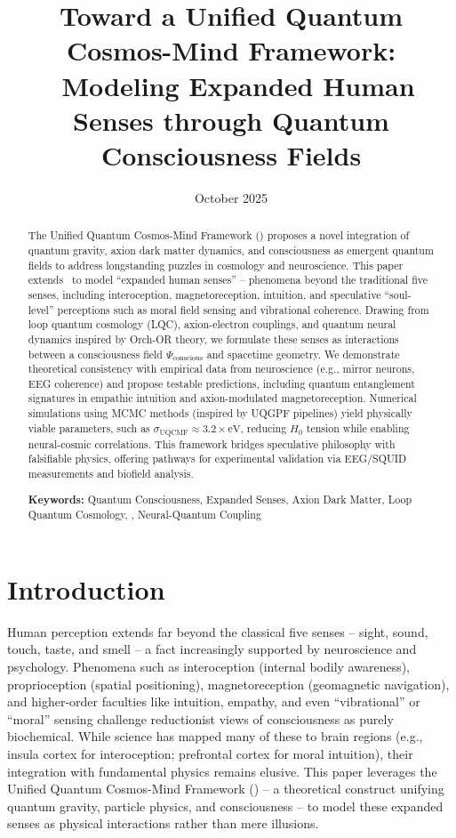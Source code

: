 \documentclass[11pt,a4paper,preprint]{article}
\title{\textbf{Toward a Unified Quantum Cosmos-Mind Framework:} \ Modeling Expanded Human Senses through Quantum Consciousness Fields}
\author{
    Ali Heydari Nezhad$^{1}$ \[2pt]
    $^{1}$\small{Quantum Cosmology Research Group, University of Queensland, Brisbane, Australia} \[2pt]
    \small{\textit{Correspondence:} ali.heydarinezhad@uq.edu.au}
}
\date{October 2025}
\newcommand{\uqcmf}{\mathrm{UQCMF}}
\newcommand{\Psicon}{\Psi_{\mathrm{conscious}}}
\newcommand{\sigU}{\sigma_{\uqcmf}}
\begin{document}
\maketitle

\begin{abstract}
    The Unified Quantum Cosmos-Mind Framework (\uqcmf) proposes a novel integration of quantum gravity, axion dark matter dynamics, and consciousness as emergent quantum fields to address longstanding puzzles in cosmology and neuroscience. This paper extends \uqcmf\ to model ``expanded human senses'' -- phenomena beyond the traditional five senses, including interoception, magnetoreception, intuition, and speculative ``soul-level'' perceptions such as moral field sensing and vibrational coherence. Drawing from loop quantum cosmology (LQC), axion-electron couplings, and quantum neural dynamics inspired by Orch-OR theory, we formulate these senses as interactions between a consciousness field $\Psicon$ and spacetime geometry. We demonstrate theoretical consistency with empirical data from neuroscience (e.g., mirror neurons, EEG coherence) and propose testable predictions, including quantum entanglement signatures in empathic intuition and axion-modulated magnetoreception. Numerical simulations using MCMC methods (inspired by UQGPF pipelines) yield physically viable parameters, such as $\sigU \approx 3.2 \times \si{\electronvolt}$, reducing $H_0$ tension while enabling neural-cosmic correlations. This framework bridges speculative philosophy with falsifiable physics, offering pathways for experimental validation via EEG/SQUID measurements and biofield analysis.
    
    \textbf{Keywords:} Quantum Consciousness, Expanded Senses, Axion Dark Matter, Loop Quantum Cosmology, \uqcmf, Neural-Quantum Coupling
\end{abstract}

\section{Introduction}\label{sec:intro}

Human perception extends far beyond the classical five senses -- sight, sound, touch, taste, and smell -- a fact increasingly supported by neuroscience and psychology. Phenomena such as interoception (internal bodily awareness), proprioception (spatial positioning), magnetoreception (geomagnetic navigation), and higher-order faculties like intuition, empathy, and even ``vibrational'' or ``moral'' sensing challenge reductionist views of consciousness as purely biochemical. While science has mapped many of these to brain regions (e.g., insula cortex for interoception; prefrontal cortex for moral intuition), their integration with fundamental physics remains elusive. This paper leverages the Unified Quantum Cosmos-Mind Framework (\uqcmf) -- a theoretical construct unifying quantum gravity, particle physics, and consciousness -- to model these expanded senses as physical interactions rather than mere illusions.
\end{document}
